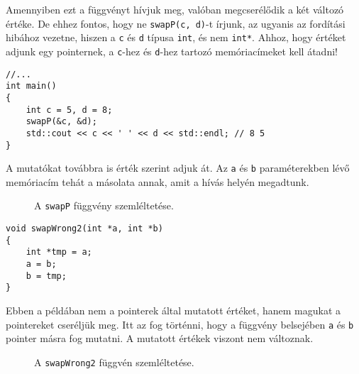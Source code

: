 \documentclass[../cpp_book/cpp_book.tex]{subfiles}
\begin{document}
	Amennyiben ezt a függvényt hívjuk meg, valóban megcserélődik a két változó értéke. De ehhez fontos, hogy ne \texttt{swapP(c, d)}-t írjunk, az ugyanis az fordítási hibához vezetne, hiszen a \texttt{c} és \texttt{d} típusa \texttt{int}, és nem \texttt{int*}. Ahhoz, hogy értéket adjunk egy pointernek, a \texttt{c}-hez és \texttt{d}-hez tartozó memóriacímeket kell átadni!
	\begin{lstlisting}
//...
int main()
{
	int c = 5, d = 8;
	swapP(&c, &d);
	std::cout << c << ' ' << d << std::endl; // 8 5
}
	\end{lstlisting}
	\begin{note}
    A mutatókat továbbra is érték szerint adjuk át. Az \texttt{a} és \texttt{b} paraméterekben lévő memóriacím tehát a másolata annak, amit a hívás helyén megadtunk.
	\end{note}
	\begin{figure}[!h]
		\centering
		
		
		\caption{A \texttt{swapP} függvény szemléltetése.}\label{fig_stack_swap_p}
	\end{figure}
	
	\begin{lstlisting}
void swapWrong2(int *a, int *b)
{
	int *tmp = a;
	a = b;
	b = tmp;
}
	\end{lstlisting}
	Ebben a példában nem a pointerek által mutatott értéket, hanem magukat a pointereket cseréljük meg. Itt az fog történni, hogy a függvény belsejében \texttt{a} és \texttt{b} pointer másra fog mutatni. A mutatott értékek viszont nem változnak.
	
	\begin{figure}[!h]
		\centering
		
		
		\caption{A \texttt{swapWrong2} függvén szemléltetése.}\label{fig_stack_swap_wrong_2}
	\end{figure}
\end{document}
